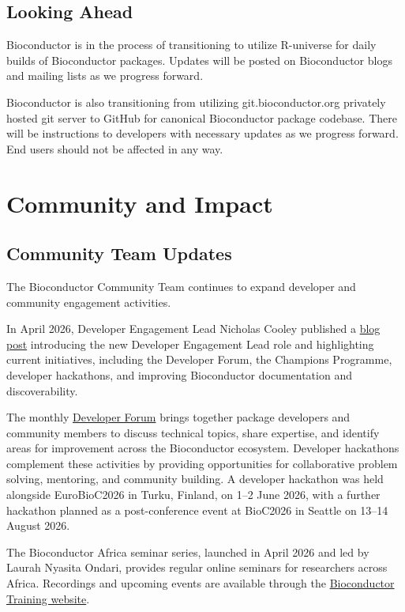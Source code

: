 \subsection{Looking Ahead}\label{looking-ahead}

Bioconductor is in the process of transitioning to utilize R-universe for daily builds
of Bioconductor packages. Updates will be posted on Bioconductor blogs and
mailing lists as we progress forward.

Bioconductor is also transitioning from utilizing git.bioconductor.org privately
hosted git server to GitHub for canonical Bioconductor package codebase. There
will be instructions to developers with necessary updates as we progress
forward. End users should not be affected in any way.

\section{Community and Impact}\label{community-and-impact}

\subsection{Community Team Updates}\label{community-team-updates}

The Bioconductor Community Team continues to expand developer and community engagement activities.

In April 2026, Developer Engagement Lead Nicholas Cooley published a \href{https://blog.bioconductor.org/posts/2026-04-09-developer-engagement/}{blog post} introducing the new Developer Engagement Lead role and highlighting current initiatives, including the Developer Forum, the Champions Programme, developer hackathons, and improving Bioconductor documentation and discoverability.

The monthly \href{https://bioconductor.org/developers/developers-forum/}{Developer Forum} brings together package developers and community members to discuss technical topics, share expertise, and identify areas for improvement across the Bioconductor ecosystem. Developer hackathons complement these activities by providing opportunities for collaborative problem solving, mentoring, and community building. A developer hackathon was held alongside EuroBioC2026 in Turku, Finland, on 1--2 June 2026, with a further hackathon planned as a post-conference event at BioC2026 in Seattle on 13--14 August 2026.

The Bioconductor Africa seminar series, launched in April 2026 and led by Laurah Nyasita Ondari, provides regular online seminars for researchers across Africa. Recordings and upcoming events are available through the \href{https://training.bioconductor.org/workshops/bioc-africa-seminars/}{Bioconductor Training website}.

